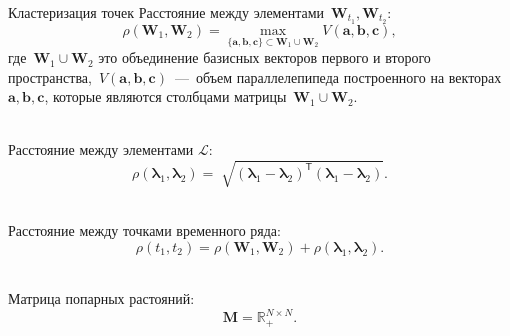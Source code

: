 \documentclass[10pt,pdf,hyperref={unicode}]{beamer}
\begin{document}
\begin{frame}[shrink=5]{Кластеризация точек}
Расстояние между элементами~$\mathbf{W}_{t_1},\mathbf{W}_{t_2}$:\\
$$
\rho\left(\textbf{W}_1, \textbf{W}_2\right) = \max_{\{\textbf{a},\textbf{b},\textbf{c}\} \subset \textbf{W}_1\cup \textbf{W}_2 } V\left(\textbf{a},\textbf{b},\textbf{c}\right), 
$$
где~$\textbf{W}_1\cup\textbf{W}_2$ это объединение базисных векторов первого и второго пространства,~$V\left(\textbf{a},\textbf{b},\textbf{c}\right)$~---~объем параллелепипеда построенного на векторах~$\textbf{a}, \textbf{b}, \textbf{c}$, которые являются столбцами матрицы~$\textbf{W}_1\cup\textbf{W}_2$.

~\\
Расстояние между элементами $\mathcal{L}$:\\
$$
\rho\left(\bm{\lambda}_1, \bm{\lambda}_2\right) = \sqrt[]{\left(\bm{\lambda}_1 - \bm{\lambda}_2\right)^{\mathsf{T}}\left(\bm{\lambda}_1 - \bm{\lambda}_2\right)}.
$$

~\\
Расстояние между точками временного ряда:\\
$$
\rho\left(t_1, t_2\right) = \rho\left(\textbf{W}_1, \textbf{W}_2\right) + \rho\left(\bm{\lambda}_1, \bm{\lambda}_2\right).
$$

~\\
Матрица попарных растояний:\\
$$\textbf{M} = \mathbb{R}_{+}^{N\times N}.$$

\end{frame}
\end{document}
